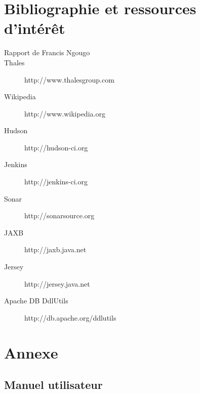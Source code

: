 \section{Bibliographie et ressources d'intérêt}

\begin{description}
	\item[Rapport de Francis Ngougo]{}
	\item[Thales]{http://www.thalesgroup.com}
	\item[Wikipedia]{http://www.wikipedia.org}
	\item[Hudson]{http://hudson-ci.org}
	\item[Jenkins]{http://jenkins-ci.org}
	\item[Sonar]{http://sonarsource.org}
	\item[JAXB]{http://jaxb.java.net}
	\item[Jersey]{http://jersey.java.net}
	\item[Apache DB DdlUtils]{http://db.apache.org/ddlutils}
\end{description}

\section{Annexe}
\subsection{Manuel utilisateur}